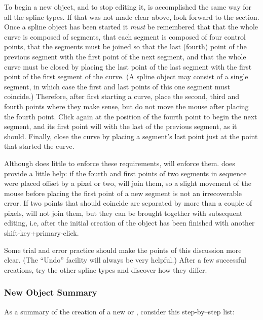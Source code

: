 			To begin a new object, and to stop editing it,
			is accomplished the same way for all the spline types.
			If that was not made
			clear above, look forward to the
			 section.
			Once a \IXbezn{} spline object has been started
			it \emph{must} be remembered that that the whole
			curve is composed of segments, that each segment
			is composed of four control points, that the
			segments must be joined so that the last (fourth) point
			of the previous segment  with
			the first point of the next segment,
			and that the whole curve must be closed by
			placing the last point of the last segment
			 with the first point
			of the first segment of the curve.
			(A \IXbezn{} spline object
			may consist of a single segment, in which case
			the first and last points of this one segment
			must coincide.) Therefore, after first starting
			a \IXbezn{} curve, place the second, third and
			fourth points where they make sense, but do not
			move the mouse after placing the fourth point.
			Click again at the position of the fourth point
			to begin the next segment, and its
			first point will  with the
			last of the previous segment, as it should.
			Finally, close the curve by placing a segment's
			last point just at the point that started the curve.
			
			Although \IXpkg{} does little to enforce these
			requirements, \IXpov{} will enforce them.
			\IXpkgu{} does provide a little help: if the
			fourth and first points of two segments in
			sequence were placed offset by a pixel or two,
			\IXpkg{} will join them, so a slight movement
			of the mouse before placing the first point
			of a new segment is not an irrecoverable error.
			If two points that should coincide are separated
			by more than a couple of pixels,
			\IXpkg{} will not join them, but they can be brought
			together with subsequent editing, i.e, after the
			initial creation of the object has been
			finished with another shift-key+primary-click.
			
			Some trial and error practice should make the
			points of this discussion more clear.
			(The ``Undo'' facility will always be very
			helpful.) After a few successful \IXbezn{}
			creations, try the other spline types and discover
			how they differ.


			\subsubsection{New Object Summary}%
			\label{sssec:new_obj_summary}
			As a summary of the creation of a new 
			or , consider this step-by--step list:
			
